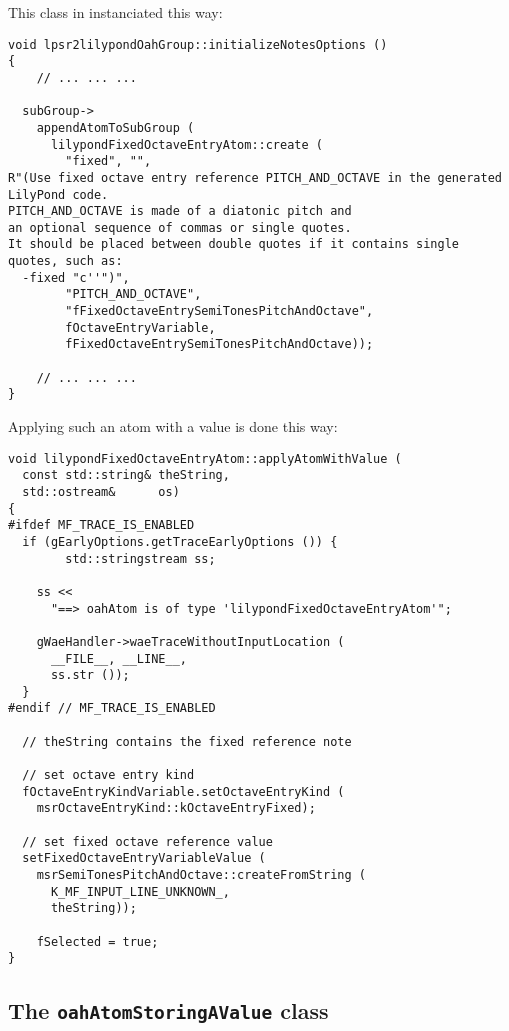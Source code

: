 This class in instanciated this way:
\begin{lstlisting}[language=CPlusPlus]
void lpsr2lilypondOahGroup::initializeNotesOptions ()
{
	// ... ... ...

  subGroup->
    appendAtomToSubGroup (
      lilypondFixedOctaveEntryAtom::create (
        "fixed", "",
R"(Use fixed octave entry reference PITCH_AND_OCTAVE in the generated LilyPond code.
PITCH_AND_OCTAVE is made of a diatonic pitch and
an optional sequence of commas or single quotes.
It should be placed between double quotes if it contains single quotes, such as:
  -fixed "c''")",
        "PITCH_AND_OCTAVE",
        "fFixedOctaveEntrySemiTonesPitchAndOctave",
        fOctaveEntryVariable,
        fFixedOctaveEntrySemiTonesPitchAndOctave));

	// ... ... ...
}
\end{lstlisting}

Applying such an atom with a value is done this way:
\begin{lstlisting}[language=CPlusPlus]
void lilypondFixedOctaveEntryAtom::applyAtomWithValue (
  const std::string& theString,
  std::ostream&      os)
{
#ifdef MF_TRACE_IS_ENABLED
  if (gEarlyOptions.getTraceEarlyOptions ()) {
		std::stringstream ss;

    ss <<
      "==> oahAtom is of type 'lilypondFixedOctaveEntryAtom'";

    gWaeHandler->waeTraceWithoutInputLocation (
      __FILE__, __LINE__,
      ss.str ());
  }
#endif // MF_TRACE_IS_ENABLED

  // theString contains the fixed reference note

  // set octave entry kind
  fOctaveEntryKindVariable.setOctaveEntryKind (
    msrOctaveEntryKind::kOctaveEntryFixed);

  // set fixed octave reference value
  setFixedOctaveEntryVariableValue (
    msrSemiTonesPitchAndOctave::createFromString (
      K_MF_INPUT_LINE_UNKNOWN_,
      theString));

	fSelected = true;
}
\end{lstlisting}


\subsection{The {\tt oahAtomStoringAValue} class}

